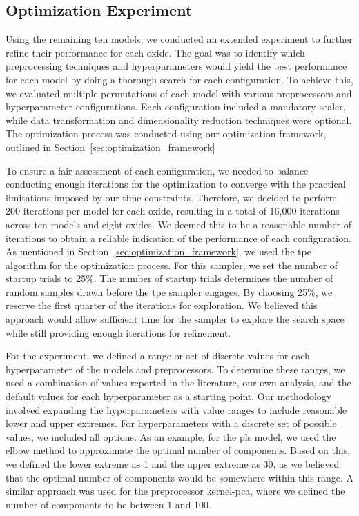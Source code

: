 \subsection{Optimization Experiment}\label{subsec:optimization_experiment_design}
Using the remaining ten models, we conducted an extended experiment to further refine their performance for each oxide. 
The goal was to identify which preprocessing techniques and hyperparameters would yield the best performance for each model by doing a thorough search for each configuration. 
To achieve this, we evaluated multiple permutations of each model with various preprocessors and hyperparameter configurations. 
Each configuration included a mandatory scaler, while data transformation and dimensionality reduction techniques were optional. 
The optimization process was conducted using our optimization framework, outlined in Section~\ref{sec:optimization_framework}

To ensure a fair assessment of each configuration, we needed to balance conducting enough iterations for the optimization to converge with the practical limitations imposed by our time constraints.
Therefore, we decided to perform 200 iterations per model for each oxide, resulting in a total of 16,000 iterations across ten models and eight oxides.
We deemed this to be a reasonable number of iterations to obtain a reliable indication of the performance of each configuration.
As mentioned in Section~\ref{sec:optimization_framework}, we used the \gls{tpe} algorithm for the optimization process.
For this sampler, we set the number of startup trials to 25\%.
The number of startup trials determines the number of random samples drawn before the \gls{tpe} sampler engages.
By choosing 25\%, we reserve the first quarter of the iterations for exploration.
We believed this approach would allow sufficient time for the sampler to explore the search space while still providing enough iterations for refinement.

For the experiment, we defined a range or set of discrete values for each hyperparameter of the models and preprocessors.
To determine these ranges, we used a combination of values reported in the literature, our own analysis, and the default values for each hyperparameter as a starting point.
Our methodology involved expanding the hyperparameters with value ranges to include reasonable lower and upper extremes.
For hyperparameters with a discrete set of possible values, we included all options. 
As an example, for the \gls{pls} model, we used the elbow method to approximate the optimal number of components. 
Based on this, we defined the lower extreme as 1 and the upper extreme as 30, as we believed that the optimal number of components would be somewhere within this range. 
A similar approach was used for the preprocessor \gls{kernel-pca}, where we defined the number of components to be between 1 and 100.

